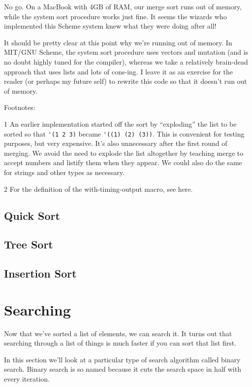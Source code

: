 \documentclass[12pt,openright,draft]{book}
\begin{document}
No go. On a MacBook with 4GB of RAM, our merge sort runs out of
memory, while the system sort procedure works just fine. It seems the
wizards who implemented this Scheme system knew what they were doing
after all!

It should be pretty clear at this point why we're running out of
memory. In MIT/GNU Scheme, the system sort procedure uses vectors and
mutation (and is no doubt highly tuned for the compiler), whereas we
take a relatively brain-dead approach that uses lists and lots of
cons-ing. I leave it as an exercise for the reader (or perhaps my
future self) to rewrite this code so that it doesn't run out of
memory.

Footnotes:

1 An earlier implementation started off the sort by
``exploding'' the list to be sorted so that
\verb|'(1 2 3)| became \verb|'((1) (2) (3))|. This is convenient for
testing purposes, but very expensive. It's also unnecessary after the
first round of merging. We avoid the need to explode the list
altogether by teaching merge to accept numbers and listify them when
they appear. We could also do the same for strings and other types as
necessary.

2 For the definition of the with-timing-output macro, see here.

\subsection{Quick Sort}

\subsection{Tree Sort}

\subsection{Insertion Sort}

\section{Searching}

Now that we've sorted a list of elements, we can search it.  It
turns out that searching through a list of things is much faster if
you can sort that list first.

In this section we'll look at a particular type of search algorithm
called binary search.  Binary search is so named because it cuts
the search space in half with every iteration.
\end{document}
